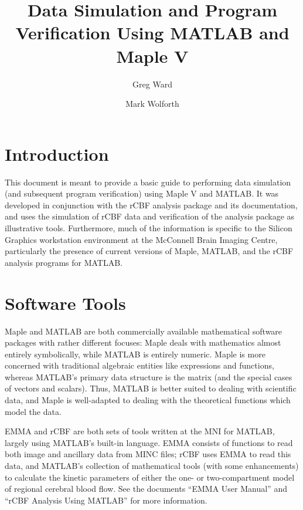 
\title{Data Simulation and Program Verification Using MATLAB and Maple V}
\author{Greg Ward \and Mark Wolforth}

\def\code#1{{\tt #1}}

\def\simuldir{~greg/matlab/testing}
\newcommand{\units}[1]{\mbox{$\rm{#1}$}}
\newcommand{\funits}[2]{\mbox{$\rm\frac{#1}{#2}$}}



\maketitle

\tableofcontents

\section{Introduction}

This document is meant to provide a basic guide to performing data
simulation (and subsequent program verification) using Maple V and
MATLAB.  It was developed in conjunction with the rCBF analysis
package and its documentation, and uses the simulation of rCBF data
and verification of the analysis package as illustrative tools.
Furthermore, much of the information is specific to the Silicon
Graphics workstation environment at the McConnell Brain Imaging
Centre, particularly the presence of current versions of Maple,
MATLAB, and the rCBF analysis programs for MATLAB.

\section{Software Tools}

Maple and MATLAB are both commercially available mathematical software
packages with rather different focuses: Maple deals with mathematics
almost entirely symbolically, while MATLAB is entirely numeric.  Maple
is more concerned with traditional algebraic entities like expressions
and functions, whereas MATLAB's primary data structure is the matrix
(and the special cases of vectors and scalars).  Thus, MATLAB is
better suited to dealing with scientific data, and Maple is
well-adapted to dealing with the theoretical functions which model the
data.

EMMA and rCBF are both sets of tools written at the MNI for MATLAB,
largely using MATLAB's built-in language.  EMMA consists of functions
to read both image and ancillary data from MINC files; rCBF uses EMMA
to read this data, and MATLAB's collection of mathematical tools (with
some enhancements) to calculate the kinetic parameters of either
the one- or two-compartment model of regional cerebral blood flow.
See the documents ``EMMA User Manual'' and ``rCBF Analysis Using
MATLAB'' for more information.

